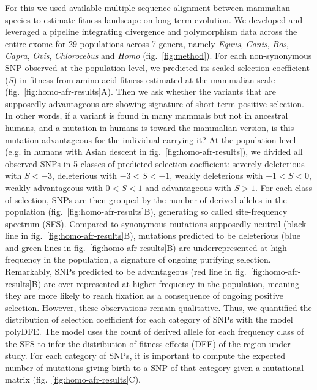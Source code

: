\documentclass{article}
\newcommand{\Sphy}{S}
\newcommand{\divStrongDel}{\Sphy < -3}
\newcommand{\divDel}{-3 < \Sphy < -1}
\newcommand{\divWeakDel}{-1 < \Sphy < 0}
\newcommand{\divWeakAdv}{0 < \Sphy < 1}
\newcommand{\divAdv}{ \Sphy > 1}
\begin{document}
    For this we used available multiple sequence alignment between mammalian species\cite{ranwez_orthomam_2007, howe_ensembl_2021} to estimate fitness landscape on long-term evolution.
    We developed and leveraged a pipeline integrating divergence and polymorphism data across the entire exome for 29 populations across 7 genera, namely \textit{Equus}, \textit{Canis}, \textit{Bos}, \textit{Capra}, \textit{Ovis}, \textit{Chlorocebus} and \textit{Homo} (fig.~\ref{fig:method}).
    For each non-synonymous SNP observed at the population level, we predicted its scaled selection coefficient ($\Sphy$) in fitness from amino-acid fitness estimated at the mammalian scale (fig.~\ref{fig:homo-afr-results}A).
    Then we ask whether the variants that are supposedly advantageous are showing signature of short term positive selection.
    In other words, if a variant is found in many mammals but not in ancestral humans, and a mutation in humans is toward the mammalian version, is this mutation advantageous for the individual carrying it?
    At the population level (e.g. in humans with Asian descent in fig.~\ref{fig:homo-afr-results}), we divided all observed SNPs in 5 classes of predicted selection coefficient: severely deleterious with $\divStrongDel$, deleterious with $\divDel$, weakly deleterious with $\divWeakDel$, weakly advantageous with $\divWeakAdv$ and advantageous with $\divAdv$.
    For each class of selection, SNPs are then grouped by the number of derived alleles in the population (fig.~\ref{fig:homo-afr-results}B), generating so called site-frequency spectrum (SFS).
    Compared to synonymous mutations supposedly neutral (black line in fig.~\ref{fig:homo-afr-results}B), mutations predicted to be deleterious (blue and green lines in fig.~\ref{fig:homo-afr-results}B) are underrepresented at high frequency in the population, a signature of ongoing purifying selection.
    Remarkably, SNPs predicted to be advantageous (red line in fig.~\ref{fig:homo-afr-results}B) are over-represented at higher frequency in the population, meaning they are more likely to reach fixation as a consequence of ongoing positive selection.
    However, these observations remain qualitative.
    Thus, we quantified the distribution of selection coefficient for each category of SNPs with the model polyDFE\cite{tataru_inference_2017, tataru_polydfe_2020}.
    The model uses the count of derived allele for each frequency class of the SFS to infer the distribution of fitness effects (DFE) of the region under study.
    For each category of SNPs, it is important to compute the expected number of mutations giving birth to a SNP of that category given a mutational matrix (fig.~\ref{fig:homo-afr-results}C).
\end{document}
